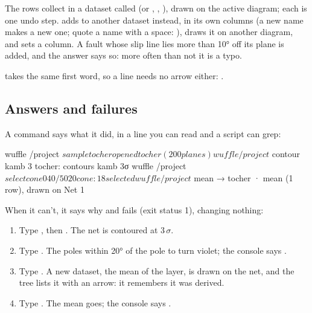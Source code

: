 The rows collect in a dataset called  (or , ,
), drawn on the active diagram; each  is one undo step.  adds to another dataset instead, in its own columns (a new name makes a new one; quote a name
with a space: ),  draws it on another diagram, and
 sets a  column. A fault whose slip line lies more than 10° off its
plane is added, and the answer says so: more often than not it is a typo.

 takes the same first word, so a line needs no arrow either:
.

\subsection{Answers and failures}

A command says what it did, in a line you can read and a script can grep:

\begin{codeblock}
wuffle /project $ sample tocher
opened tocher (200 planes)
wuffle /project $ contour kamb 3
tocher: contours kamb 3σ
wuffle /project $ select cone 040/50 20
cone: 18 selected
wuffle /project $ mean
→ tocher · mean (1 row), drawn on Net 1
\end{codeblock}

When it can't, it says why and fails (exit status 1), changing nothing:


\begin{tryit}
\begin{enumerate}
\item Type , then . The net is contoured at 3\,$\sigma$.
\item Type . The poles within 20° of the pole to  turn violet;
the console says .
\item Type . A new dataset, the mean of the layer, is drawn on the net, and the tree lists it
with an arrow: it remembers it was derived.
\item Type . The mean goes; the console says .
\end{enumerate}
\end{tryit}

